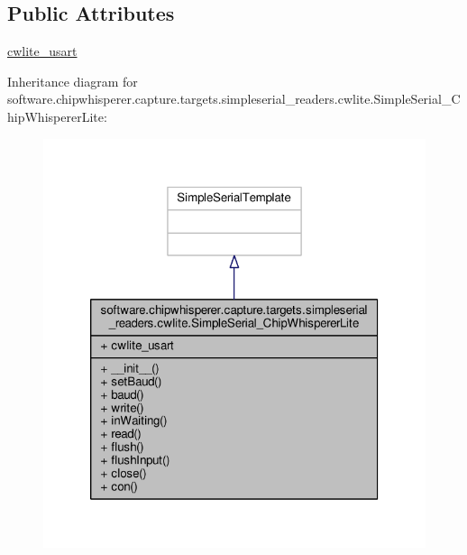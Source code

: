 \subsection*{Public Attributes}
\begin{DoxyCompactItemize}
\item 
\hyperlink{classsoftware_1_1chipwhisperer_1_1capture_1_1targets_1_1simpleserial__readers_1_1cwlite_1_1SimpleSerial__ChipWhispererLite_a9c2060c999bfecfbd635ce557c764293}{cwlite\+\_\+usart}
\end{DoxyCompactItemize}


Inheritance diagram for software.\+chipwhisperer.\+capture.\+targets.\+simpleserial\+\_\+readers.\+cwlite.\+Simple\+Serial\+\_\+\+Chip\+Whisperer\+Lite\+:\nopagebreak
\begin{figure}[H]
\begin{center}
\leavevmode
\includegraphics[width=320pt]{d5/d38/classsoftware_1_1chipwhisperer_1_1capture_1_1targets_1_1simpleserial__readers_1_1cwlite_1_1Simpl4e68a8a8c4c483efb1530bdf79842642}
\end{center}
\end{figure}


